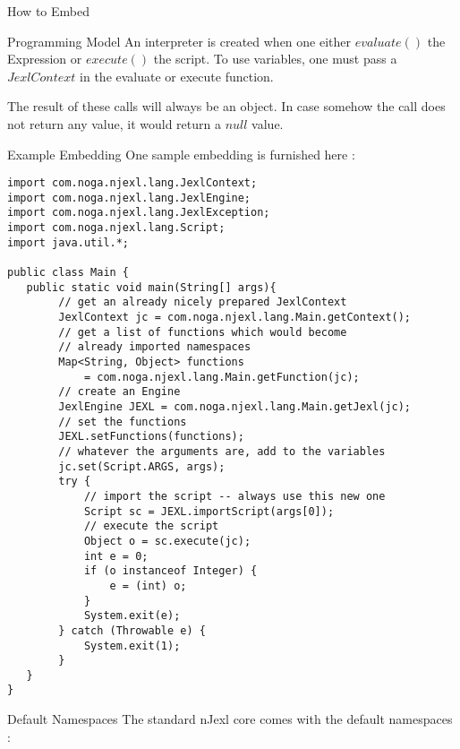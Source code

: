 \begin{section}{How to Embed}
\begin{subsection}{Programming Model}
An interpreter is created when one either $evaluate()$ the Expression or $execute()$ the script.
To use variables, one must pass a $JexlContext$ in the evaluate or execute function.   

The result of these calls will always be an object. In case somehow the call does not return 
any value, it would return a $null$ value. 

\end{subsection}

\begin{subsection}{Example Embedding}
One sample embedding is furnished here :


\begin{center}\begin{minipage}{\linewidth}
\begin{lstlisting}[style=myJavaStyle]
import com.noga.njexl.lang.JexlContext;
import com.noga.njexl.lang.JexlEngine;
import com.noga.njexl.lang.JexlException;
import com.noga.njexl.lang.Script;
import java.util.*;

public class Main {
   public static void main(String[] args){
        // get an already nicely prepared JexlContext
        JexlContext jc = com.noga.njexl.lang.Main.getContext();
        // get a list of functions which would become 
        // already imported namespaces
        Map<String, Object> functions 
            = com.noga.njexl.lang.Main.getFunction(jc);
        // create an Engine 
        JexlEngine JEXL = com.noga.njexl.lang.Main.getJexl(jc);
        // set the functions 
        JEXL.setFunctions(functions);
        // whatever the arguments are, add to the variables 
        jc.set(Script.ARGS, args);
        try {
            // import the script -- always use this new one 
            Script sc = JEXL.importScript(args[0]);
            // execute the script 
            Object o = sc.execute(jc);
            int e = 0;
            if (o instanceof Integer) {
                e = (int) o;
            }
            System.exit(e);
        } catch (Throwable e) {
            System.exit(1);
        }
   }
}
\end{lstlisting}  
\end{minipage}\end{center}
\end{subsection}

\begin{subsection}{Default Namespaces}
The standard nJexl core comes with the default namespaces :


\end{subsection}
\end{section}
